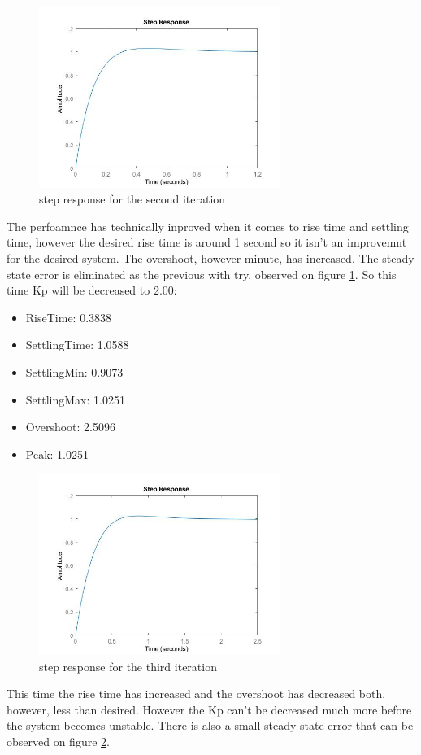 \documentclass[12pt]{article}
\begin{document}
\begin{figure}[htbp]
  \centering
  \includegraphics[width=0.7\textwidth]{images/second_kp_adjustment.jpg}
  \caption{step response for the second iteration} \label{my_second_step}
\end{figure}
The perfoamnce has technically inproved when it comes to rise time and settling time, however the desired rise time is around 1 second so it isn't an improvemnt for the desired system. The overshoot, however minute, has increased. The steady state error is eliminated as the previous with try, observed on figure \ref{my_second_step}. So this time Kp will be decreased to 2.00:
\begin{itemize}
  \item RiseTime: 0.3838
  \item SettlingTime: 1.0588
  \item SettlingMin: 0.9073
  \item SettlingMax:  1.0251
  \item Overshoot: 2.5096
  \item Peak: 1.0251
\end{itemize}
\begin{figure}[htbp]
  \centering
  \includegraphics[width=0.7\textwidth]{images/3_kp_adjustment.jpg}
  \caption{step response for the third iteration} \label{my_third_step}
\end{figure}
This time the rise time has increased and the overshoot has decreased both, however, less than desired. However the Kp can't be decreased much more before the system becomes unstable. There is also a small steady state error that can be observed on figure \ref{my_third_step}.
\end{document}

